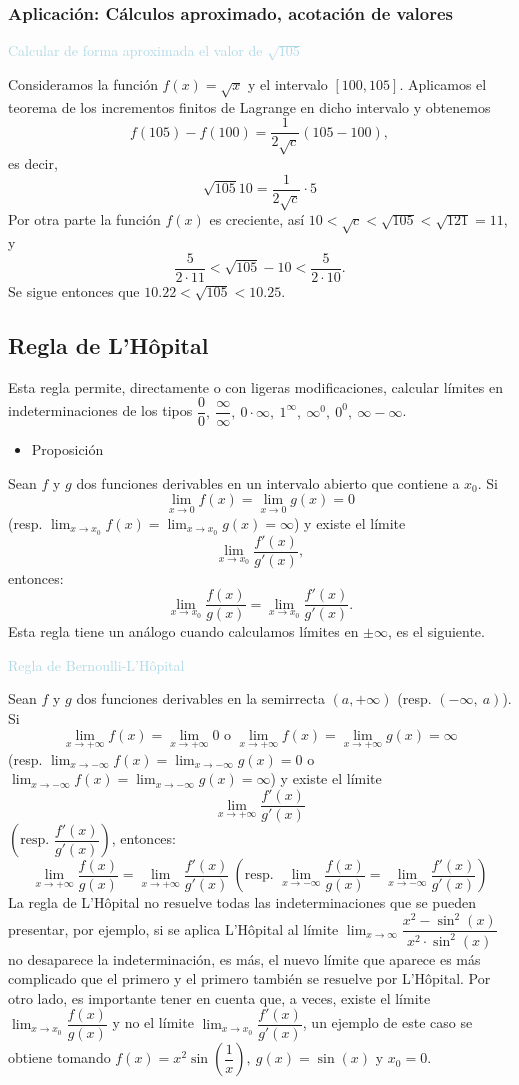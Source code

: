 \subsubsection{Aplicación: Cálculos aproximado, acotación de valores}
\textcolor{lightblue}{Calcular de forma aproximada el valor de $\sqrt{105}$}

Consideramos la función $f(x)=\sqrt{x}$ y el intervalo $[100,105]$. Aplicamos el teorema de los incrementos finitos de Lagrange en dicho intervalo y obtenemos \[ f(105)-f(100)=\dfrac{1}{2\sqrt{c}}(105-100), \] es decir, \[ \sqrt{105}10=\dfrac{1}{2\sqrt{c}} \cdot5\]
Por otra parte la función $f(x)$ es creciente, así $10<\sqrt{c}<\sqrt{105}<\sqrt{121}=11$, y \[ \dfrac{5}{2\cdot11} <\sqrt{105}-10<\dfrac{5}{2\cdot10}.\]
Se sigue entonces que $10.22<\sqrt{105}<10.25$.
\subsection{Regla de L'Hôpital}
Esta regla permite, directamente o con ligeras modificaciones, calcular límites en indeterminaciones de los tipos $\dfrac{0}{0},~\dfrac{\infty}{\infty},~0\cdot\infty,~1^\infty,~\infty^0,~0^0,~\infty-\infty$.
\begin{itemize}[label=\color{red}\textbullet, leftmargin=*]
	\item \color{lightblue}Proposición
\end{itemize}
Sean $f$ y $g$ dos funciones derivables en un intervalo abierto que contiene a $x_0$. Si \[ \lim_{x\to0}f(x)=\lim_{x\to0}g(x)=0 \] (resp. $\lim_{x\to x_0}f(x)=\lim_{x\to x_0}g(x)=\infty$) y existe el límite \[ \lim_{x\to x_0}\dfrac{f'(x)}{g'(x)}, \] entonces: \[ \lim_{x\to x_0}\dfrac{f(x)}{g(x)}=\lim_{x\to x_0}\dfrac{f'(x)}{g'(x)}. \]
Esta regla tiene un análogo cuando calculamos límites en $\pm\infty$, es el siguiente.

\textcolor{lightblue}{Regla de Bernoulli-L'Hôpital}

Sean $f$ y $g$ dos funciones derivables en la semirrecta $(a,+\infty)$ (resp. $(-\infty,~a)$). Si \[ \lim_{x\to+\infty}f(x)=\lim_{x\to+\infty}0 \text{ o } \lim_{x\to+\infty}f(x)=\lim_{x\to+\infty}g(x)=\infty \] (resp. $\lim_{x\to-\infty}f(x)=\lim_{x\to-\infty}g(x)=0$ o $\lim_{x\to-\infty}f(x)=\lim_{x\to-\infty}g(x)=\infty$) y existe el límite \[ \lim_{x\to+\infty}\dfrac{f'(x)}{g'(x)} \] $\left(\text{resp. }\dfrac{f'(x)}{g'(x)}\right)$, entonces: \[ \lim_{x\to+\infty}\dfrac{f(x)}{g(x)}=\lim_{x\to+\infty}\dfrac{f'(x)}{g'(x)}~\left(\text{resp. }\lim_{x\to-\infty}\dfrac{f(x)}{g(x)}=\lim_{x\to-\infty}\dfrac{f'(x)}{g'(x)}\right) \]
La regla de L'Hôpital no resuelve todas las indeterminaciones que se pueden presentar, por ejemplo, si se aplica L'Hôpital al límite $\lim_{x\to\infty}\dfrac{x^2-\sin^2(x)}{x^2\cdot\sin^2(x)}$ no desaparece la  indeterminación, es más, el nuevo límite que aparece es más complicado que el primero y el primero también se resuelve por L'Hôpital. Por otro lado, es importante tener en cuenta que, a veces, existe el límite $\lim_{x\to x_0}\dfrac{f(x)}{g(x)}$ y no el límite $\lim_{x\to x_0}\dfrac{f'(x)}{g'(x)}$, un ejemplo de este caso se obtiene tomando $f(x)=x^2\sin\left(\dfrac{1}{x}\right),~g(x)=\sin(x)$ y $x_0=0$.
